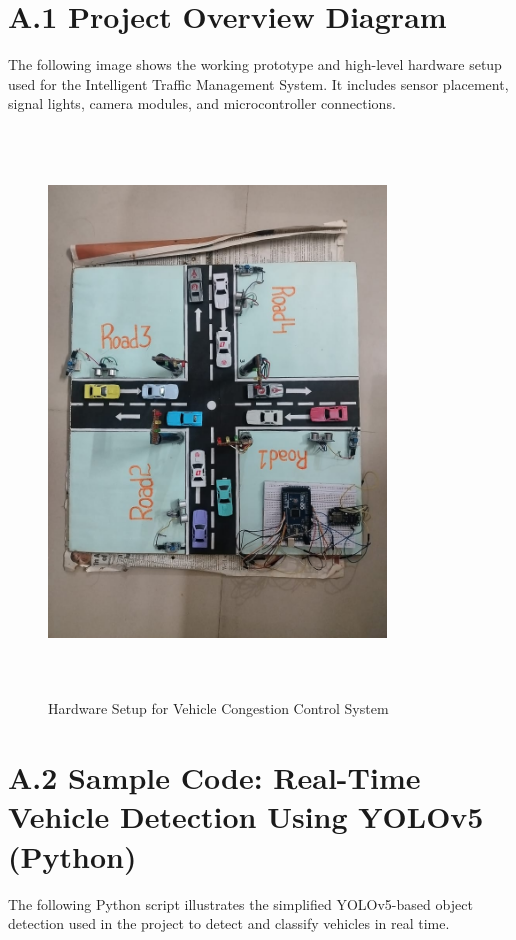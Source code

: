 \documentclass[12pt]{report}
\begin{document}
\section*{A.1 Project Overview Diagram}

The following image shows the working prototype and high-level hardware setup used for the Intelligent Traffic Management System. It includes sensor placement, signal lights, camera modules, and microcontroller connections.

\begin{figure}[H]
    \centering
    \includegraphics[width=0.8\textwidth, height=15cm]{Figures/project_hardware.jpg}
    \caption{Hardware Setup for Vehicle Congestion Control System}
    \label{fig:hardware_setup}
\end{figure}

\section*{A.2 Sample Code: Real-Time Vehicle Detection Using YOLOv5 (Python)}

The following Python script illustrates the simplified YOLOv5-based object detection used in the project to detect and classify vehicles in real time.
\end{document}
